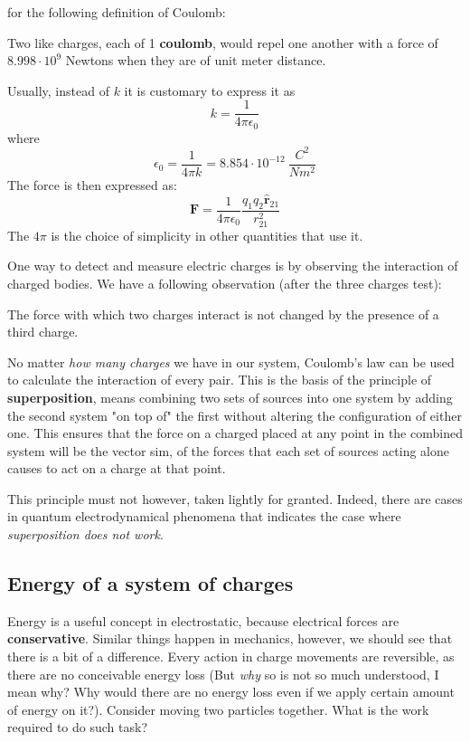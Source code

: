 for the following definition of Coulomb: 

\begin{definition}
    Two like charges, each of 1 \textbf{coulomb}, would repel one another with a force of $8.998\cdot 10^{9}$ Newtons when they are of unit meter distance. 
\end{definition}

Usually, instead of $k$ it is customary to express it as $$k=\frac{1}{4\pi \epsilon_{0}}$$
where $$\epsilon_{0}=\frac{1}{4\pi k}= 8.854\cdot 10^{-12} \: \frac{C^{2}}{Nm^{2}}$$
The force is then expressed as: 
$$
\mathbf{F} = \frac{1}{4\pi \epsilon_{0}} \frac{q_{1}q_{2}\mathbf{\hat{r}}_{21}}{r^{2}_{21}}
$$
The $4\pi$ is the choice of simplicity in other quantities that use it. 

One way to detect and measure electric charges is by observing the interaction of  charged bodies. We have a following observation (after the three charges test): 

\begin{lemma}
    The force with which two charges interact is not changed by the presence of a third charge. 
\end{lemma}

No matter \textit{how many charges} we have in our system, Coulomb's law can be used to calculate the interaction of every pair. This is the basis of the principle of \textbf{superposition}, means combining two sets of sources into one system by adding the second system "on top of" the first without altering the configuration of either one. This ensures that the force on a charged placed at any point in the combined system will be the vector sim, of the forces that each set of sources acting alone causes to act on a charge at that point. 

This principle must not however, taken lightly for granted. Indeed, there are cases in quantum electrodynamical phenomena that indicates the case where \textit{superposition does not work}. 

\subsection{Energy of a system of charges}

Energy is a useful concept in electrostatic, because electrical forces are \textbf{conservative}. Similar things happen in mechanics, however, we should see that there is a bit of a difference. Every action in charge movements are reversible, as there are no conceivable energy loss (But \textit{why} so is not so much understood, I mean why? Why would there are no energy loss even if we apply certain amount of energy on it?). Consider moving two particles together. What is the work required to do such task? 

